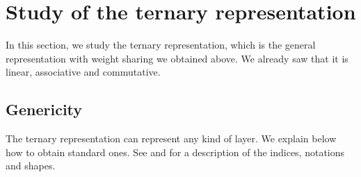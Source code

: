 \section{Study of the ternary representation}
\label{sec:ternary}

In this section, we study the ternary representation, which is the general representation with weight sharing we obtained above. We already saw that it is linear, associative and commutative.

\subsection{Genericity}


The ternary representation can represent any kind of layer. We explain below how to obtain standard ones. See  and  for a description of the indices, notations and shapes.

